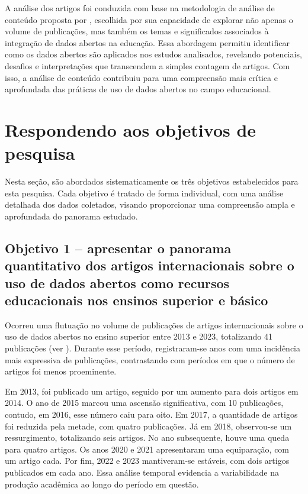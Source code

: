 \documentclass[portuguese]{textolivre}
\begin{document}
A análise dos artigos foi conduzida com base na metodologia de análise de conteúdo proposta por \textcite{krippendorff1980}, escolhida por sua capacidade de explorar não apenas o volume de publicações, mas também os temas e significados associados à integração de dados abertos na educação. Essa abordagem permitiu identificar como os dados abertos são aplicados nos estudos analisados, revelando potenciais, desafios e interpretações que transcendem a simples contagem de artigos. Com isso, a análise de conteúdo contribuiu para uma compreensão mais crítica e aprofundada das práticas de uso de dados abertos no campo educacional.

\section{Respondendo aos objetivos de pesquisa}\label{sec-fmt-manuscrito}
Nesta seção, são abordados sistematicamente os três objetivos estabelecidos para esta pesquisa. Cada objetivo é tratado de forma individual, com uma análise detalhada dos dados coletados, visando proporcionar uma compreensão ampla e aprofundada do panorama estudado.

\subsection{Objetivo 1 – apresentar o panorama quantitativo dos artigos internacionais sobre o uso de dados abertos como recursos educacionais nos ensinos superior e básico}\label{sec-formato}
Ocorreu uma flutuação no volume de publicações de artigos internacionais sobre o uso de dados abertos no ensino superior entre 2013 e 2023, totalizando 41 publicações (ver ). Durante esse período, registraram-se anos com uma incidência mais expressiva de publicações, contrastando com períodos em que o número de artigos foi menos proeminente. 

Em 2013, foi publicado um artigo, seguido por um aumento para dois artigos em 2014. O ano de 2015 marcou uma ascensão significativa, com 10 publicações, contudo, em 2016, esse número caiu para oito. Em 2017, a quantidade de artigos foi reduzida pela metade, com quatro publicações. Já em 2018, observou-se um ressurgimento, totalizando seis artigos. No ano subsequente, houve uma queda para quatro artigos. Os anos 2020 e 2021 apresentaram uma equiparação, com um artigo cada. Por fim, 2022 e 2023 mantiveram-se estáveis, com dois artigos publicados em cada ano. Essa análise temporal evidencia a variabilidade na produção acadêmica ao longo do período em questão.  
\end{document}
